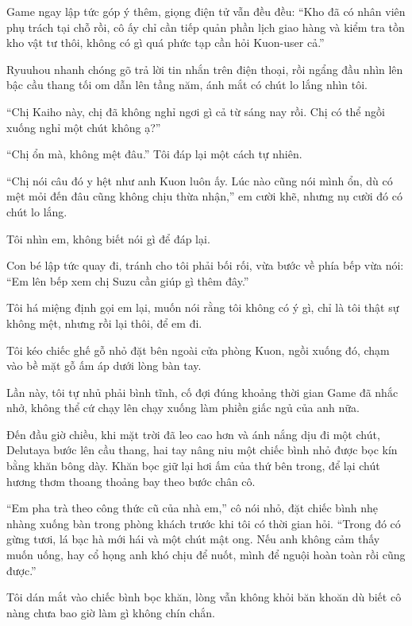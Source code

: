 \documentclass[../main.tex]{subfiles}
\begin{document}
Game ngay lập tức góp ý thêm, giọng điện tử vẫn đều đều: ``Kho đã có nhân viên phụ trách tại chỗ rồi, cô ấy chỉ cần tiếp quản phần lịch giao hàng và kiểm tra tồn kho vật tư thôi, không có gì quá phức tạp cần hỏi Kuon-user cả.''

Ryuuhou nhanh chóng gõ trả lời tin nhắn trên điện thoại, rồi ngẩng đầu nhìn lên bậc cầu thang tối om dẫn lên tầng năm, ánh mắt có chút lo lắng nhìn tôi.

``Chị Kaiho này, chị đã không nghỉ ngơi gì cả từ sáng nay rồi. Chị có thể ngồi xuống nghỉ một chút không ạ?''

``Chị ổn mà, không mệt đâu.'' Tôi đáp lại một cách tự nhiên.

``Chị nói câu đó y hệt như anh Kuon luôn ấy. Lúc nào cũng nói mình ổn, dù có mệt mỏi đến đâu cũng không chịu thừa nhận,'' em cười khẽ, nhưng nụ cười đó có chút lo lắng.

Tôi nhìn em, không biết nói gì để đáp lại.

Con bé lập tức quay đi, tránh cho tôi phải bối rối, vừa bước về phía bếp vừa nói: ``Em lên bếp xem chị Suzu cần giúp gì thêm đây.''

Tôi há miệng định gọi em lại, muốn nói rằng tôi không có ý gì, chỉ là tôi thật sự không mệt, nhưng rồi lại thôi, để em đi.

Tôi kéo chiếc ghế gỗ nhỏ đặt bên ngoài cửa phòng Kuon, ngồi xuống đó, chạm vào bề mặt gỗ ấm áp dưới lòng bàn tay.

Lần này, tôi tự nhủ phải bình tĩnh, cố đợi đúng khoảng thời gian Game đã nhắc nhở, không thể cứ chạy lên chạy xuống làm phiền giấc ngủ của anh nữa.

\ct


Đến đầu giờ chiều, khi mặt trời đã leo cao hơn và ánh nắng dịu đi một chút, Delutaya bước lên cầu thang, hai tay nâng niu một chiếc bình nhỏ được bọc kín bằng khăn bông dày. Khăn bọc giữ lại hơi ấm của thứ bên trong, để lại chút hương thơm thoang thoảng bay theo bước chân cô.

``Em pha trà theo công thức cũ của nhà em,'' cô nói nhỏ, đặt chiếc bình nhẹ nhàng xuống bàn trong phòng khách trước khi tôi có thời gian hỏi. ``Trong đó có gừng tươi, lá bạc hà mới hái và một chút mật ong. Nếu anh không cảm thấy muốn uống, hay cổ họng anh khó chịu để nuốt, mình để nguội hoàn toàn rồi cũng được.''

Tôi dán mắt vào chiếc bình bọc khăn, lòng vẫn không khỏi băn khoăn dù biết cô nàng chưa bao giờ làm gì không chín chắn.
\end{document}
